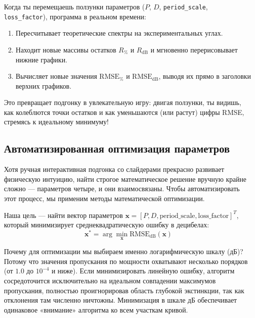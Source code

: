 
Когда ты перемещаешь ползунки параметров ($P$, $D$, \texttt{period\_scale}, \texttt{loss\_factor}), программа в реальном времени:
\begin{enumerate}
    \item Пересчитывает теоретические спектры на экспериментальных углах.
    \item Находит новые массивы остатков $R_{\%}$ и $R_{\text{dB}}$ и мгновенно перерисовывает нижние графики.
    \item Вычисляет новые значения $\text{RMSE}_{\%}$ и $\text{RMSE}_{\text{dB}}$, выводя их прямо в заголовки верхних графиков.
\end{enumerate}
Это превращает подгонку в увлекательную игру: двигая ползунки, ты видишь, как колеблются точки остатков и как уменьшаются (или растут) цифры RMSE, стремясь к идеальному минимуму!

\subsection{Автоматизированная оптимизация параметров}

Хотя ручная интерактивная подгонка со слайдерами прекрасно развивает физическую интуицию, найти строгое математическое решение вручную крайне сложно — параметров четыре, и они взаимосвязаны. Чтобы автоматизировать этот процесс, мы применим методы математической оптимизации.

Наша цель — найти вектор параметров $\mathbf{x} = [P, D, \text{period\_scale}, \text{loss\_factor}]^T$, который минимизирует среднеквадратическую ошибку в децибелах:
\begin{equation}
\mathbf{x}^* = \arg\min_{\mathbf{x}} \text{RMSE}_{\text{dB}}(\mathbf{x})
\end{equation}

Почему для оптимизации мы выбираем именно логарифмическую шкалу (дБ)? Потому что значения пропускания по мощности охватывают несколько порядков (от $1.0$ до $10^{-4}$ и ниже). Если минимизировать линейную ошибку, алгоритм сосредоточится исключительно на идеальном совпадении максимумов пропускания, полностью проигнорировав область глубокой экстинкции, так как отклонения там численно ничтожны. Минимизация в шкале дБ обеспечивает одинаковое «внимание» алгоритма ко всем участкам кривой.

